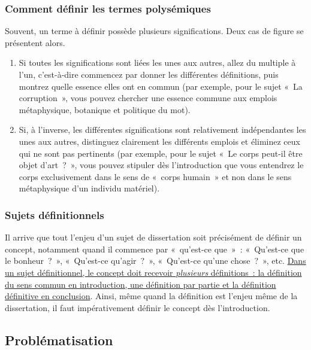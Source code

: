 \documentclass[a4paper,12pt]{article}
\begin{document}
\subsubsection{Comment définir les termes polysémiques}
\label{sec:orge959d42}

Souvent, un terme à définir possède plusieurs significations. Deux cas
de figure se présentent alors. 

\begin{enumerate}
\item Si toutes les significations sont liées les unes aux autres, allez du
multiple à l'un, c'est-à-dire commencez par donner les différentes
définitions, puis montrez quelle essence elles ont en commun (par
exemple, pour le sujet « La corruption », vous pouvez chercher une
essence commune aux emplois métaphysique, botanique et politique du
mot).
\item Si, à l'inverse, les différentes significations sont relativement
indépendantes les unes aux autres, distinguez clairement les
différents emplois et éliminez ceux qui ne sont pas pertinents (par
exemple, pour le sujet « Le corps peut-il être objet d'art ? », vous
pouvez stipuler dès l'introduction que vous entendrez le corps
exclusivement dans le sens de « corps humain » et non dans le sens
métaphysique d'un individu matériel).
\end{enumerate}

\subsubsection{Sujets définitionnels}
\label{sec:org12987b1}

Il arrive que tout l'enjeu d'un sujet de dissertation soit précisément
de définir un concept, notamment quand il commence par « qu'est-ce
que » : « Qu'est-ce que le bonheur ? », « Qu'est-ce qu'agir ? »,
« Qu'est-ce qu'une chose ? », etc. \uline{Dans un sujet définitionnel, le
concept doit recevoir \emph{plusieurs} définitions : la définition du sens
commun en introduction, une définition par partie et la définition
définitive en conclusion}. Ainsi, même quand la définition est l'enjeu
même de la dissertation, il faut impérativement définir le concept dès
l'introduction.


\subsection{Problématisation}
\label{sec:orged42ddc}
\label{orga319222}
\end{document}
